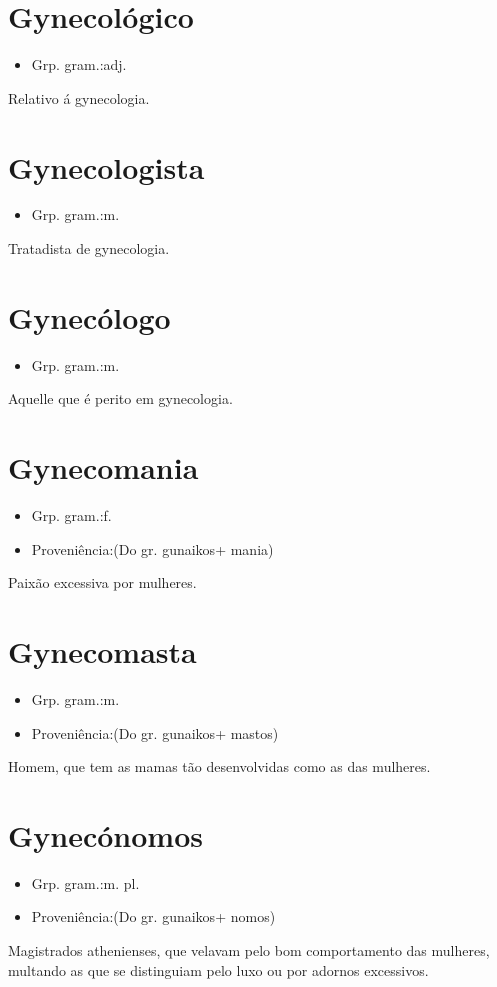 \section{Gynecológico}
\begin{itemize}
\item {Grp. gram.:adj.}
\end{itemize}
Relativo á gynecologia.
\section{Gynecologista}
\begin{itemize}
\item {Grp. gram.:m.}
\end{itemize}
Tratadista de gynecologia.
\section{Gynecólogo}
\begin{itemize}
\item {Grp. gram.:m.}
\end{itemize}
Aquelle que é perito em gynecologia.
\section{Gynecomania}
\begin{itemize}
\item {Grp. gram.:f.}
\end{itemize}
\begin{itemize}
\item {Proveniência:(Do gr. \textunderscore gunaikos\textunderscore  + \textunderscore mania\textunderscore )}
\end{itemize}
Paixão excessiva por mulheres.
\section{Gynecomasta}
\begin{itemize}
\item {Grp. gram.:m.}
\end{itemize}
\begin{itemize}
\item {Proveniência:(Do gr. \textunderscore gunaikos\textunderscore  + \textunderscore mastos\textunderscore )}
\end{itemize}
Homem, que tem as mamas tão desenvolvidas como as das mulheres.
\section{Gynecónomos}
\begin{itemize}
\item {Grp. gram.:m. pl.}
\end{itemize}
\begin{itemize}
\item {Proveniência:(Do gr. \textunderscore gunaikos\textunderscore  + \textunderscore nomos\textunderscore )}
\end{itemize}
Magistrados athenienses, que velavam pelo bom comportamento das mulheres, multando as que se distinguiam pelo luxo ou por adornos excessivos.
